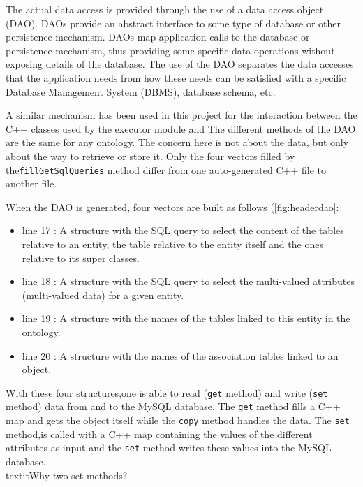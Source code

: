 The actual data access is provided through the use of a data access object (DAO).
DAOs provide an abstract interface to some type of database or other persistence
mechanism. DAOs map application calls to the database or persistence mechanism, 
thus providing some specific data operations without exposing
details of the database. The use of the DAO separates the data accesses that the application needs from how these needs can be satisfied with a specific
Database Management System (DBMS), database schema, etc.

A similar mechanism has been used in this project for the interaction between the C++ classes used by the executor module and 
The different methods of the DAO are the same for any ontology. 
The concern here is not about the data, but only about the way to retrieve or store it. Only the four vectors filled by the\texttt{fillGetSqlQueries} method differ from one 
auto-generated C++ file to another file.

When the DAO is generated, four vectors are built as follows (\ref{fig:headerdao}:

\begin{itemize}
\item line \textcolor{BrickRed}{17} : A structure with the SQL query to select the content of the tables relative to an entity, the table relative to the entity itself and the ones relative to its super classes.
\item line \textcolor{BrickRed}{18} : A structure with the SQL query to select the multi-valued attributes (multi-valued data) for a given entity.
\item line \textcolor{BrickRed}{19} : A structure with the names of the tables linked to this entity in the ontology.
\item line \textcolor{BrickRed}{20} : A structure with the names of the association tables linked to an object.
\end{itemize}

With these four structures,one is able to read (\texttt{get} method) and write (\texttt{set} method) data from and to the MySQL database. The \texttt{get} method fills 
a C++ map and gets the object itself while the \texttt{copy} method handles the data. The \texttt{set} method,is called with a C++ map containing the values of the 
different attributes as input and the \texttt{set} method writes these values into the MySQL database. \\textit{Why two set methods?}


